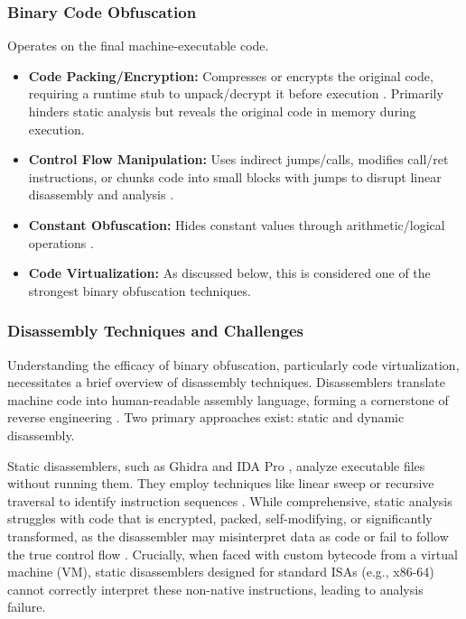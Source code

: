 \subsubsection{Binary Code Obfuscation} Operates on the final machine-executable code.
\begin{itemize}
    \item \textbf{Code Packing/Encryption:} Compresses or encrypts the original code, requiring a runtime stub to unpack/decrypt it before execution \cite{Rou13}. Primarily hinders static analysis but reveals the original code in memory during execution.
    \item \textbf{Control Flow Manipulation:} Uses indirect jumps/calls, modifies call/ret instructions, or chunks code into small blocks with jumps to disrupt linear disassembly and analysis \cite{Rou13}.
    \item \textbf{Constant Obfuscation:} Hides constant values through arithmetic/logical operations \cite{Rou13}.
    \item \textbf{Code Virtualization:} As discussed below, this is considered one of the strongest binary obfuscation techniques.
\end{itemize}

\subsubsection{Disassembly Techniques and Challenges}
Understanding the efficacy of binary obfuscation, particularly code virtualization, necessitates a brief overview of disassembly techniques. Disassemblers translate machine code into human-readable assembly language, forming a cornerstone of reverse engineering \cite{Sikorski2012}. Two primary approaches exist: static and dynamic disassembly.

Static disassemblers, such as Ghidra \cite{Nat19} and IDA Pro \cite{Hex91}, analyze executable files without running them. They employ techniques like linear sweep or recursive traversal to identify instruction sequences \cite{Eilam2011, Ko2007}. While comprehensive, static analysis struggles with code that is encrypted, packed, self-modifying, or significantly transformed, as the disassembler may misinterpret data as code or fail to follow the true control flow \cite{Sikorski2012, Blazytko2017}. Crucially, when faced with custom bytecode from a virtual machine (VM), static disassemblers designed for standard ISAs (e.g., x86-64) cannot correctly interpret these non-native instructions, leading to analysis failure.

